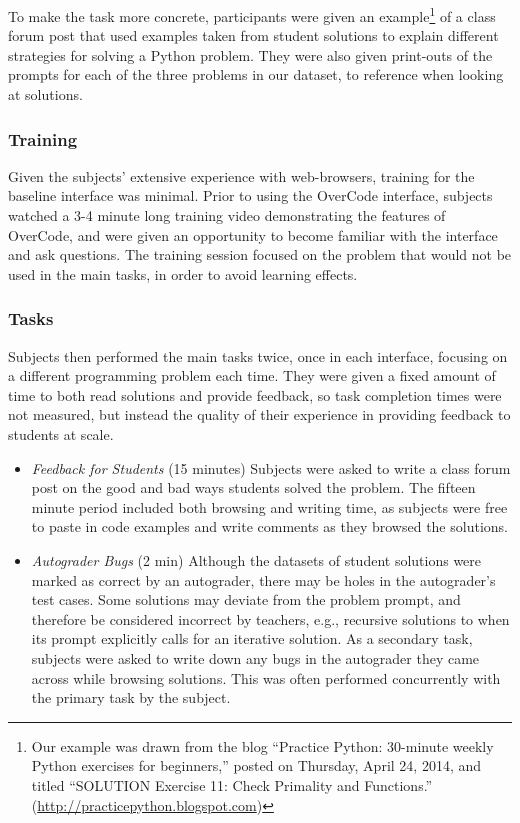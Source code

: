 To make the task more concrete, participants were given an example\footnote{Our example was drawn from the blog ``Practice Python: 30-minute weekly Python exercises for beginners,'' posted on Thursday, April 24, 2014, and titled ``SOLUTION Exercise 11: Check Primality and Functions.'' (\url{http://practicepython.blogspot.com})} of a class forum post that used examples taken from student solutions to explain different strategies for solving a Python problem. They were also given print-outs of the prompts for each of the three problems in our dataset, to reference when looking at solutions.\subsubsection{Training}

Given the subjects' extensive experience with web-browsers, training for the baseline interface was minimal. Prior to using the OverCode interface, subjects watched a 3-4 minute long training video demonstrating the features of OverCode, and were given an opportunity to become familiar with the interface and ask questions. The training session focused on the problem that would not be used in the main tasks, in order to avoid learning effects.

\subsubsection{Tasks}
Subjects then performed the main tasks twice, once in each interface, focusing on a different programming problem each time. They were given a fixed amount of time to both read solutions and provide feedback, so task completion times were not measured, but instead the quality of their experience in providing feedback to students at scale.

\begin{itemize}
\item {\it Feedback for Students} (15 minutes) Subjects were asked to write a class forum post on the good and bad ways students solved the problem. The fifteen minute period included both browsing and writing time, as subjects were free to paste in code examples and write comments as they browsed the solutions.

\item {\it Autograder Bugs} (2 min) Although the datasets of student solutions were marked as correct by an autograder, there may be holes in the autograder's test cases. Some solutions may deviate from the problem prompt, and therefore be considered incorrect by teachers, e.g., recursive solutions to  when its prompt explicitly calls for an iterative solution. As a secondary task, subjects were asked to write down any bugs in the autograder they came across while browsing solutions. This was often performed concurrently with the primary task by the subject.
\end{itemize}
